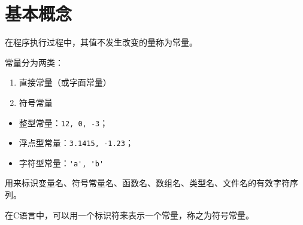 \section{基本概念}

\begin{frame}
\begin{dingyi}[常量]

在程序执行过程中，其值不发生改变的量称为常量。
\end{dingyi} \vspace{0.1in}

常量分为两类：\vspace{0.05in}

\begin{enumerate}
\item 直接常量（或字面常量）\\[0.1in]
\item 符号常量
\end{enumerate}
\end{frame}


\begin{frame}

\begin{itemize}
\item 整型常量：\lstinline|12, 0, -3|；\\[0.1in]
\item 浮点型常量：\lstinline|3.1415, -1.23|；\\[0.1in]
\item 字符型常量：\lstinline|'a', 'b'|
\end{itemize}
\end{frame}

\begin{frame}[fragile]

\begin{dingyi}[标识符]
用来标识变量名、符号常量名、函数名、数组名、类型名、文件名的有效字符序列。
\end{dingyi} \pause \vspace{0.1in}

\begin{dingyi}[符号常量]

在C语言中，可以用一个标识符来表示一个常量，称之为符号常量。
\end{dingyi} 
\end{frame}

